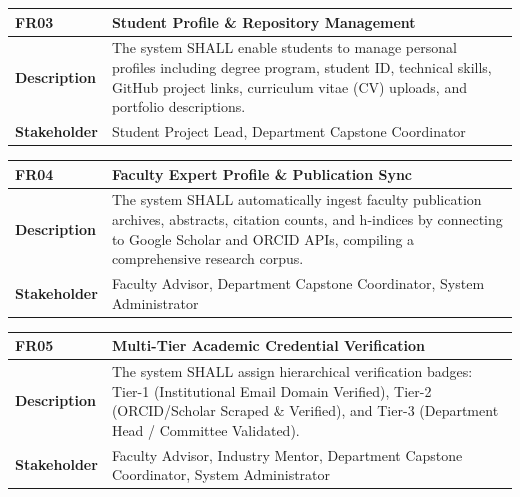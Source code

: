 \begin{table}[H]
\centering
\small
\begin{tabularx}{\textwidth}{|l|X|}
\hline
\rowcolor{lightgray!40} \textbf{FR03} & \textbf{Student Profile \& Repository Management} \\ \hline
\textbf{Description} & The system SHALL enable students to manage personal profiles including degree program, student ID, technical skills, GitHub project links, curriculum vitae (CV) uploads, and portfolio descriptions. \\ \hline
\textbf{Stakeholder} & Student Project Lead, Department Capstone Coordinator \\ \hline
\end{tabularx}
\end{table}

\begin{table}[H]
\centering
\small
\begin{tabularx}{\textwidth}{|l|X|}
\hline
\rowcolor{lightgray!40} \textbf{FR04} & \textbf{Faculty Expert Profile \& Publication Sync} \\ \hline
\textbf{Description} & The system SHALL automatically ingest faculty publication archives, abstracts, citation counts, and h-indices by connecting to Google Scholar and ORCID APIs, compiling a comprehensive research corpus. \\ \hline
\textbf{Stakeholder} & Faculty Advisor, Department Capstone Coordinator, System Administrator \\ \hline
\end{tabularx}
\end{table}

\begin{table}[H]
\centering
\small
\begin{tabularx}{\textwidth}{|l|X|}
\hline
\rowcolor{lightgray!40} \textbf{FR05} & \textbf{Multi-Tier Academic Credential Verification} \\ \hline
\textbf{Description} & The system SHALL assign hierarchical verification badges: Tier-1 (Institutional Email Domain Verified), Tier-2 (ORCID/Scholar Scraped \& Verified), and Tier-3 (Department Head / Committee Validated). \\ \hline
\textbf{Stakeholder} & Faculty Advisor, Industry Mentor, Department Capstone Coordinator, System Administrator \\ \hline
\end{tabularx}
\end{table}


